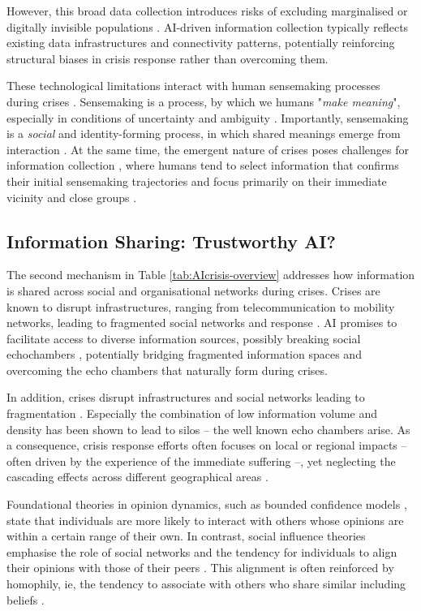 \documentclass[pdflatex,sn-apa]{sn-jnl}%
\begin{document}
However, this broad data collection introduces risks of excluding marginalised or digitally invisible populations \citep{coleman2024weaving}. AI-driven information collection typically reflects existing data infrastructures and connectivity patterns, potentially reinforcing structural biases in crisis response rather than overcoming them.

These technological limitations interact with human sensemaking processes during crises \citep{klein2010rapid}. Sensemaking is a process, by which we humans "\textit{make meaning}", especially in conditions of uncertainty and ambiguity \citep{weick2005organizing}. Importantly, sensemaking is a \textit{social} and identity-forming process, in which shared meanings emerge from interaction \citep{maitlis2010sensemaking}. At the same time, the emergent nature of crises poses challenges for information collection \citep{turoff2004design}, where humans tend to  select information that confirms their initial sensemaking trajectories \citep{barbera2015tweeting} and focus primarily on their immediate vicinity and close groups \citep{comes2020coordination}.


\subsection{Information Sharing: Trustworthy AI?}
The second mechanism in Table \ref{tab:AIcrisis-overview} addresses how information is shared across social and organisational networks during crises. Crises are known to disrupt infrastructures, ranging from telecommunication to mobility networks, leading to fragmented social networks and response \citep{holguin2012unique}. AI promises to facilitate access to diverse information sources, possibly breaking social echochambers \citep{jeon2024hearhere}, potentially bridging fragmented information spaces and overcoming the echo chambers that naturally form during crises.

In addition, crises disrupt infrastructures and social networks leading to fragmentation \citep{wolbers2018introducing}. Especially the combination of low information volume and density has been shown to lead to silos \citep{pan2012crisis} -- the well known echo chambers arise. As a consequence, crisis response efforts often focuses on local or regional impacts -- often driven by the experience of the immediate suffering --, yet neglecting the cascading effects across different geographical areas \citep{sigala2022mitigating}.

Foundational theories in opinion dynamics, such as bounded confidence models \citep{hegselmann2002opinion}, state that individuals are more likely to interact with others whose opinions are within a certain range of their own. In contrast, social influence theories emphasise the role of social networks and the tendency for individuals to align their opinions with those of their peers \citep{friedkin1999social}. This alignment is often reinforced by homophily, ie, the tendency to associate with others who share similar including beliefs \citep{mcpherson2001birds}.
\end{document}
